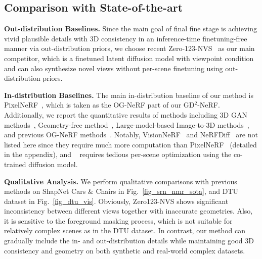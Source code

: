 \subsection{\textbf{Comparison with State-of-the-art}}
\label{sec:compari_sota}

\noindent\textbf{Out-distribution Baselines.} Since the main goal of final fine stage is achieving vivid plausible details with 3D consistency in an inference-time finetuning-free manner via out-distribution priors, we choose recent Zero-123-NVS~\cite{liu2023zero123} as our main competitor, which is a finetuned latent diffusion model with viewpoint condition and can also synthesize novel views without per-scene finetuning using out-distribution priors.  

\vspace{0.1cm}
\noindent\textbf{In-distribution Baselines.} The main in-distribution baseline of our method is PixelNeRF~\cite{PixelNeRF_yu2021pixelnerf}, which is taken as the OG-NeRF part of our GD$^2$-NeRF. Additionally, we report the quantitative results of methods including 3D GAN methods~\cite{PiGAN_chan2021pi,Pix2NeRF_cai2022pix2nerf,chan2022EG3D}, Geometry-free method~\cite{watson20223DiM},  Large-model-based Image-to-3D methods~\cite{Jain_2021_ICCV_dietnerf,Xu_2022_SinNeRF}, and previous OG-NeRF methods~\cite{SRN_sitzmann2019scene,CodeNeRF_jang2021codenerf,FE_NVS_guo2022fast}. Notably, VisionNeRF~\cite{lin2023visionnerf} and NeRFDiff~\cite{gu2023nerfdiff} are not listed here since they require much more computation than PixelNeRF~\cite{lin2023visionnerf,gu2023nerfdiff} (detailed in the appendix), and ~\cite{gu2023nerfdiff} requires tedious per-scene optimization using the co-trained diffusion model. 


\noindent\textbf{Qualitative Analysis.}
We perform qualitative comparisons with previous methods on ShapNet Cars \& Chairs in Fig.~\ref{fig_srn_nmr_sota}, and DTU dataset in Fig.~\ref{fig_dtu_vis}. Obviously, Zero123-NVS shows significant inconsistency between different views together with inaccurate geometries. Also, it is sensitive to the foreground masking process, which is not suitable for relatively complex scenes as in the DTU dataset. In contrast, our method can gradually include the in- and out-distribution details while maintaining good 3D consistency and geometry on both synthetic and real-world complex datasets. 

